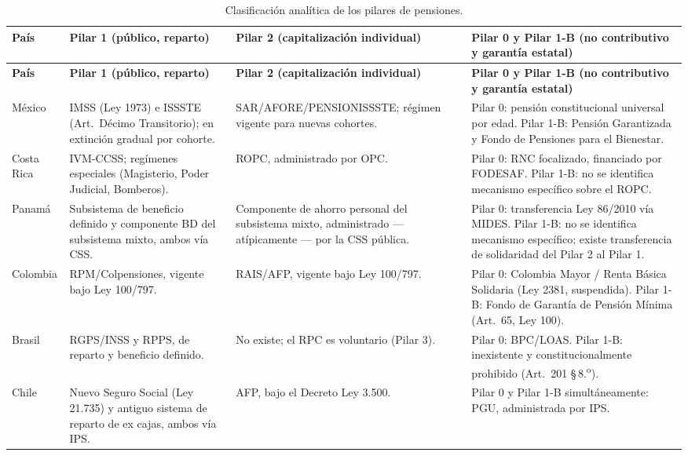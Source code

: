 \documentclass[12pt, letterpaper]{article}
\begin{document}
\begin{xltabular}{\textwidth}{P{1.7cm}Y Y Y}
\caption{Clasificación analítica de los pilares de pensiones.}
\label{tab:sspsas}\\
\toprule
\textbf{País} & \textbf{Pilar 1 (público, reparto)} & \textbf{Pilar 2 (capitalización individual)} & \textbf{Pilar 0 y Pilar 1-B (no contributivo y garantía estatal)} \\
\midrule
\endfirsthead

\toprule
\textbf{País} & \textbf{Pilar 1 (público, reparto)} & \textbf{Pilar 2 (capitalización individual)} & \textbf{Pilar 0 y Pilar 1-B (no contributivo y garantía estatal)} \\
\midrule
\endhead

\bottomrule
\endfoot

México &
IMSS (Ley 1973) e ISSSTE (Art.\ Décimo Transitorio); en extinción gradual por cohorte. &
SAR/\allowbreak AFORE/\allowbreak PENSIONISSSTE; régimen vigente para nuevas cohortes. &
Pilar 0: pensión constitucional universal por edad. Pilar 1-B: Pensión Garantizada y Fondo de Pensiones para el Bienestar. \\

Costa Rica &
IVM-CCSS; regímenes especiales (Magisterio, Poder Judicial, Bomberos). &
ROPC, administrado por OPC. &
Pilar 0: RNC focalizado, financiado por FODESAF. Pilar 1-B: no se identifica mecanismo específico sobre el ROPC. \\

Panamá &
Subsistema de beneficio definido y componente BD del subsistema mixto, ambos vía CSS. &
Componente de ahorro personal del subsistema mixto, administrado --- atípicamente --- por la CSS pública. &
Pilar 0: transferencia Ley 86/2010 vía MIDES. Pilar 1-B: no se identifica mecanismo específico; existe transferencia de solidaridad del Pilar 2 al Pilar 1. \\

Colombia &
RPM/Colpensiones, vigente bajo Ley 100/797. &
RAIS/AFP, vigente bajo Ley 100/797. &
Pilar 0: Colombia Mayor / Renta Básica Solidaria (Ley 2381, suspendida). Pilar 1-B: Fondo de Garantía de Pensión Mínima (Art.\ 65, Ley 100). \\

Brasil &
RGPS/INSS y RPPS, de reparto y beneficio definido. &
No existe; el RPC es voluntario (Pilar 3). &
Pilar 0: BPC/LOAS. Pilar 1-B: inexistente y constitucionalmente prohibido (Art.\ 201 \S\,8.\textsuperscript{o}). \\

Chile &
Nuevo Seguro Social (Ley 21.735) y antiguo sistema de reparto de ex cajas, ambos vía IPS. &
AFP, bajo el Decreto Ley 3.500. &
Pilar 0 y Pilar 1-B simultáneamente: PGU, administrada por IPS. \\

\end{xltabular}
\end{document}
